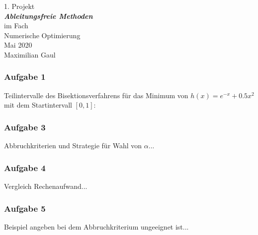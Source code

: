 \documentclass[a4paper, 12pt]{report}
\begin{document}
\begin{center}
    \vspace*{2em}
    \normalsize 1. Projekt\\
    \vspace*{1em}
    \normalsize \textbf{\textit{Ableitungsfreie Methoden}}\\
    \vspace*{4em}
    \normalsize im Fach\\
    \vspace*{1em}
    \large Numerische Optimierung\\
    \vspace*{30em}
    \normalsize Mai 2020\\
    \vspace*{1em}
    \normalsize Maximilian Gaul
\end{center}

\thispagestyle{empty}

\newpage

\subsubsection{Aufgabe 1}
Teilintervalle des Bisektionsverfahrens für das Minimum von $h(x) = e^{-x} + 0.5x^2$ mit dem Startintervall $[0, 1]$:
\\

\subsubsection{Aufgabe 3}
Abbruchkriterien und Strategie für Wahl von $\alpha$...
\\

\subsubsection{Aufgabe 4}
Vergleich Rechenaufwand...
\\

\subsubsection{Aufgabe 5}
Beispiel angeben bei dem Abbruchkriterium ungeeignet ist...
\\
\end{document}
